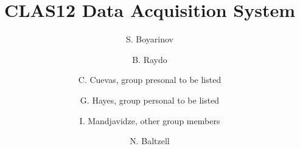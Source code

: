 \title{CLAS12 Data Acquisition System}

\author[A]{S. Boyarinov}
\author[A]{B. Raydo}
\author[A]{C. Cuevas, group presonal to be listed}
\author[A]{G. Hayes, group personal to be listed}
\author[B]{I. Mandjavidze, other group members}
\author[A]{N. Baltzell}

\address[A]{Thomas Jefferson National Accelerator Facility, Newport News, VA, USA}
\address[B]{Sacley, France}
\address[C]{INFN, Milan, Italy}
